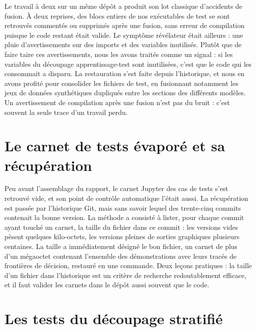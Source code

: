 \documentclass[11pt,a4paper]{report}
\begin{document}
Le travail à deux sur un même dépôt a produit son lot classique
d'accidents de fusion. À deux reprises, des blocs entiers de nos
exécutables de test se sont retrouvés commentés ou supprimés après une
fusion, sans erreur de compilation puisque le code restant était valide.
Le symptôme révélateur était ailleurs : une pluie d'avertissements sur
des imports et des variables inutilisés. Plutôt que de faire taire ces
avertissements, nous les avons traités comme un signal : si les
variables du découpage apprentissage-test sont inutilisées, c'est que le
code qui les consommait a disparu. La restauration s'est faite depuis
l'historique, et nous en avons profité pour consolider les fichiers de
test, en fusionnant notamment les jeux de données synthétiques dupliqués
entre les sections des différents modèles. Un avertissement de
compilation après une fusion n'est pas du bruit : c'est souvent la seule
trace d'un travail perdu.

\hypertarget{le-carnet-de-tests-uxe9vaporuxe9-et-sa-ruxe9cupuxe9ration}{%
\section{Le carnet de tests évaporé et sa
récupération}\label{le-carnet-de-tests-uxe9vaporuxe9-et-sa-ruxe9cupuxe9ration}}

Peu avant l'assemblage du rapport, le carnet Jupyter des cas de tests
s'est retrouvé vide, et son point de contrôle automatique l'était aussi.
La récupération est passée par l'historique Git, mais sans savoir lequel
des trente-cinq commits contenait la bonne version. La méthode a
consisté à lister, pour chaque commit ayant touché un carnet, la taille
du fichier dans ce commit : les versions vides pèsent quelques
kilo-octets, les versions pleines de sorties graphiques plusieurs
centaines. La taille a immédiatement désigné le bon fichier, un carnet
de plus d'un mégaoctet contenant l'ensemble des démonstrations avec
leurs tracés de frontières de décision, restauré en une commande. Deux
leçons pratiques : la taille d'un fichier dans l'historique est un
critère de recherche redoutablement efficace, et il faut valider les
carnets dans le dépôt aussi souvent que le code.

\hypertarget{les-tests-du-duxe9coupage-stratifiuxe9}{%
\section{Les tests du découpage
stratifié}\label{les-tests-du-duxe9coupage-stratifiuxe9}}
\end{document}
